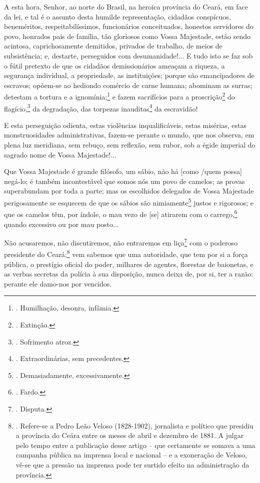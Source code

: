 A esta hora, Senhor, ao norte do Brasil, na heroica província do Ceará,
em face da lei, e tal é o assunto desta humilde representação, cidadãos
conspícuos, beneméritos, respeitabilíssimos, funcionários conceituados,
honestos servidores do povo, honrados pais de família, tão gloriosos
como Vossa Majestade, estão sendo acintosa, caprichosamente demitidos,
privados de trabalho, de meios de subsistência; e, destarte, perseguidos
com desumanidade!... E tudo isto se faz sob o fútil pretexto de que os
cidadãos demissionários ameaçam a riqueza, a segurança individual, a
propriedade, as instituições; porque são emancipadores de escravos;
opõem-se ao hediondo comércio de carne humana; abominam as surras;
detestam a tortura e a ignomínia;\footnote{. Humilhação, desonra,
  infâmia.} e fazem sacrifícios para a proscrição\footnote{. Extinção.}
do flagício,\footnote{. Sofrimento atroz.} da degradação, das torpezas
inauditas\footnote{. Extraordinárias, sem precedentes.} da escravidão!

E esta perseguição odienta, estas violências inqualificáveis, estas
misérias, estas monstruosidades administrativas, fazem-se perante o
mundo, que nos observa, em plena luz meridiana, sem rebuço, sem
reflexão, sem rubor, sob a égide imperial do sagrado nome de Vossa
Majestade!...

Que Vossa Majestade é grande filósofo, um sábio, não há {[}como /quem
possa{]} negá-lo; é também incontestável que somos nós um povo de
camelos; as provas superabundam por toda a parte; mas os escolhidos
delegados de Vossa Majestade perigosamente se esquecem de que os sábios
são nimiamente\footnote{. Demasiadamente, excessivamente.} justos e
rigorosos; e que os camelos têm, por índole, o mau vezo de {[}se{]}
atirarem com o carrego,\footnote{. Fardo.} quando excessivo ou por mau
posto...

Não acusaremos, não discutiremos, não entraremos em liça\footnote{.
  Disputa.} com o poderoso presidente do Ceará;\footnote{. Refere-se a
  Pedro Leão Veloso (1828-1902), jornalista e político que presidiu a
  província do Ceára entre os meses de abril e dezembro de 1881. A
  julgar pelo tempo entre a publicação desse artigo -- que certamente se
  somava a uma campanha pública na imprensa local e nacional -- e a
  exoneração de Veloso, vê-se que a pressão na imprensa pode ter surtido
  efeito na administração da província.} vem sabemos que uma autoridade,
que tem por si a força pública, o prestígio oficial do poder, milhares
de agentes, florestas de baionetas, e as verbas secretas da polícia à
sua disposição, nunca deixa de, por si, ter a razão: perante ele
damo-nos por vencidos.

